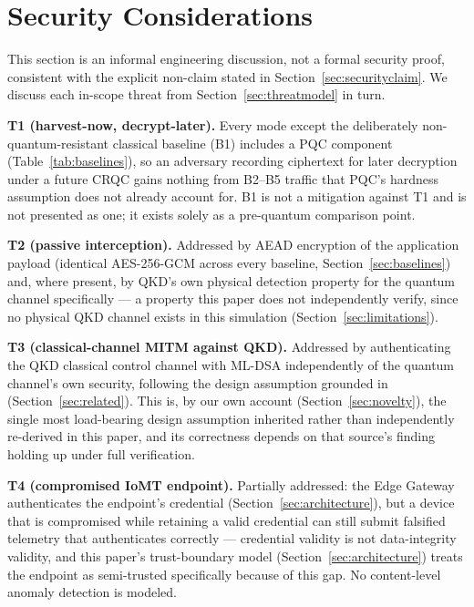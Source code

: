 \documentclass[journal]{IEEEtran}
\begin{document}
\section{Security Considerations}
\label{sec:security}

This section is an informal engineering discussion, not a formal security proof, consistent with the explicit non-claim stated in Section~\ref{sec:securityclaim}. We discuss each in-scope threat from Section~\ref{sec:threatmodel} in turn.

\textbf{T1 (harvest-now, decrypt-later).} Every mode except the deliberately non-quantum-resistant classical baseline (B1) includes a PQC component (Table~\ref{tab:baselines}), so an adversary recording ciphertext for later decryption under a future CRQC gains nothing from B2--B5 traffic that PQC's hardness assumption does not already account for. B1 is not a mitigation against T1 and is not presented as one; it exists solely as a pre-quantum comparison point.

\textbf{T2 (passive interception).} Addressed by AEAD encryption of the application payload (identical AES-256-GCM across every baseline, Section~\ref{sec:baselines}) and, where present, by QKD's own physical detection property for the quantum channel specifically --- a property this paper does not independently verify, since no physical QKD channel exists in this simulation (Section~\ref{sec:limitations}).

\textbf{T3 (classical-channel MITM against QKD).} Addressed by authenticating the QKD classical control channel with ML-DSA independently of the quantum channel's own security, following the design assumption grounded in~\cite{atutxasanz2025authentication} (Section~\ref{sec:related}). This is, by our own account (Section~\ref{sec:novelty}), the single most load-bearing design assumption inherited rather than independently re-derived in this paper, and its correctness depends on that source's finding holding up under full verification.

\textbf{T4 (compromised IoMT endpoint).} Partially addressed: the Edge Gateway authenticates the endpoint's credential (Section~\ref{sec:architecture}), but a device that is compromised while retaining a valid credential can still submit falsified telemetry that authenticates correctly --- credential validity is not data-integrity validity, and this paper's trust-boundary model (Section~\ref{sec:architecture}) treats the endpoint as semi-trusted specifically because of this gap. No content-level anomaly detection is modeled.
\end{document}
